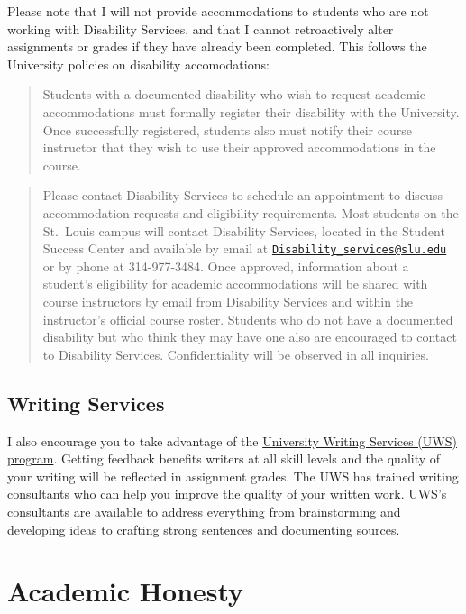 \documentclass[]{book}
\begin{document}
Please note that I will not provide accommodations to students who are not working with Disability Services, and that I cannot retroactively alter assignments or grades if they have already been completed. This follows the University policies on disability accomodations:

\begin{quote}
Students with a documented disability who wish to request academic accommodations must formally register their disability with the University. Once successfully registered, students also must notify their course instructor that they wish to use their approved accommodations in the course.
\end{quote}

\begin{quote}
Please contact Disability Services to schedule an appointment to discuss accommodation requests and eligibility requirements. Most students on the St.~Louis campus will contact Disability Services, located in the Student Success Center and available by email at \href{mailto:Disability_services@slu.edu}{\nolinkurl{Disability\_services@slu.edu}} or by phone at 314-977-3484. Once approved, information about a student's eligibility for academic accommodations will be shared with course instructors by email from Disability Services and within the instructor's official course roster. Students who do not have a documented disability but who think they may have one also are encouraged to contact to Disability Services. Confidentiality will be observed in all inquiries.
\end{quote}

\hypertarget{writing-services}{%
\subsection{Writing Services}\label{writing-services}}

I also encourage you to take advantage of the \href{https://www.slu.edu/life-at-slu/student-success-center/academic-support/university-writing-services/index.php}{University Writing Services (UWS) program}. Getting feedback benefits writers at all skill levels and the quality of your writing will be reflected in assignment grades. The UWS has trained writing consultants who can help you improve the quality of your written work. UWS's consultants are available to address everything from brainstorming and developing ideas to crafting strong sentences and documenting sources.

\hypertarget{academic-honesty}{%
\section{Academic Honesty}\label{academic-honesty}}
\end{document}
